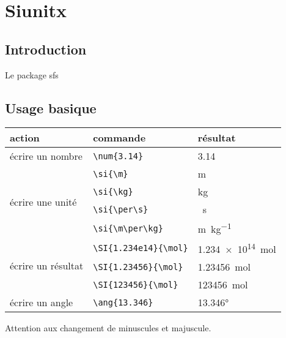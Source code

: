 \section{Siunitx}
\subsection{Introduction}
Le package sfs

\subsection{Usage basique}
\begin{tabularx}{0.8\textwidth}{ |X |l |l |}
	action	& commande	& résultat	\\
	\hline
	écrire un nombre	& \verb|\num{3.14}|	& \num{3.14}	\\
	\hline
	\multirow{4}{40mm}{écrire une unité}	& \verb|\si{\m}|		& \si{\m}\\
											& \verb|\si{\kg}|		& \si{\kg}\\
											& \verb|\si{\per\s}|	& \si{\per\s}\\
											& \verb|\si{\m\per\kg}|	& \si{\m\per\kg}\\
	\hline
	\multirow{3}{40mm}{écrire un résultat}	& \verb|\SI{1.234e14}{\mol}|		& \SI{1.234e14}{\mol}\\
											& \verb|\SI{1.23456}{\mol}|		& \SI{1.23456}{\mol}\\
											& \verb|\SI{123456}{\mol}|		& \SI{123456}{\mol}\\
	\hline
	écrire un angle		& \verb|\ang{13.346}|	& \ang{13.346}\\
\end{tabularx}

Attention aux changement de minuscules et majuscule.
